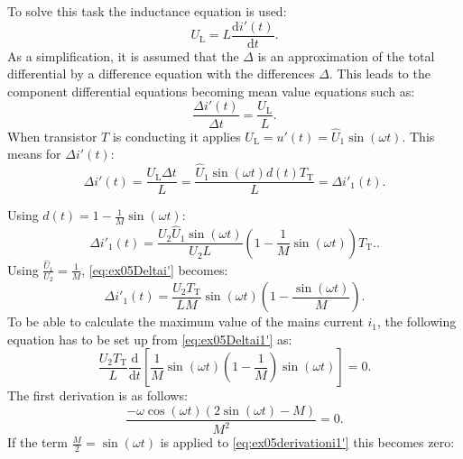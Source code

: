 
\begin{solutionblock}
    To solve this task the inductance equation is used:
    \begin{equation}
        U_{\mathrm{L}} = L \frac{\mathrm{d}i'(t)}{\mathrm{d}t}.
    \end{equation}
    As a simplification, it is assumed that the $\Delta$ is an approximation of the total differential by a difference equation with the differences $\Delta$. This leads to the component differential equations becoming mean value equations such as:
    \begin{equation}
        \frac{\Delta i'(t)}{\Delta t} = \frac{U_{\mathrm{L}}}{L}.
    \end{equation}
    When transistor $T$ is conducting it applies $U_{\mathrm{L}} = u'(t) = \hat U_{\mathrm{1}} \sin(\omega t)$.
    This means for $\Delta i'(t)$:
\begin{equation}
    \Delta i'(t) = \frac{ U_{\mathrm{L}} \Delta t}{L} = \frac{\hat U_{\mathrm{1}} \sin(\omega t) d(t) T_{\mathrm{T}}}{L} = \Delta i'_{\mathrm{1}}(t).
\end{equation}

Using $d(t) = 1 -\frac{1}{M} \sin(\omega t)$:
 \begin{equation}
     \Delta i'_{\mathrm{1}}(t) = \frac{U_{\mathrm{2}}\hat U_{\mathrm{1}}\sin (\omega t)}{U_{\mathrm{2}}L}(1-\frac{1}{M}\sin(\omega t)) T_{\mathrm{T}}.\label{eq:ex05Deltai'}.
 \end{equation}
 Using $\frac{\hat U_{\mathrm{1}}}{U_{\mathrm{2}}} = \frac{1}{M}$, \eqref{eq:ex05Deltai'} becomes:
 \begin{equation}
     \Delta i'_{\mathrm{1}}(t) = \frac{U_{\mathrm{2}}T_{\mathrm{T}}}{LM}\sin (\omega t)(1-\frac{\sin(\omega t)}{M}). \label{eq:ex05Deltai1'}
 \end{equation}
   To be able to calculate the maximum value of the mains current
    $i_\mathrm{1}$, the following equation has to be set up from \eqref{eq:ex05Deltai1'} as:
    \begin{equation}
        \frac{U_{\mathrm{2}}T_{\mathrm{T}}}{L} \frac{\mathrm{d}}{\mathrm{d}t}\left[\frac{1}{M}\sin(\omega t)\left(1-\frac{1}{M}\right)\sin(\omega t)\right] =0.
    \end{equation}
    The first derivation is as follows:
    \begin{equation}
        \frac{-\omega \cos(\omega t)(2\sin(\omega t)-M)}{M^2}=0.\label{eq:ex05derivationi1'}
    \end{equation}
    If the term $\frac{M}{2}=\sin(\omega t)$ is applied to \eqref{eq:ex05derivationi1'} this becomes zero:


\end{solutionblock}
